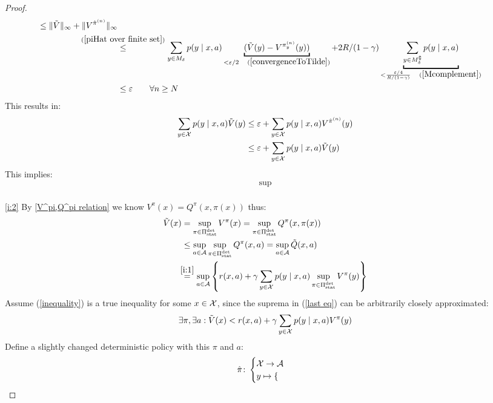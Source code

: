 \begin{proof}
\begin{align*}
{			\le \|\tilde{V}\|_\infty + \| V^{\hat{\pi}^{(n)}}\|_\infty
		} \\
		&\lxlq{(\ref{piHat over finite set})} \sum_{y\in M_\delta}p(y\mid x,a) 
		\underbracket{(\tilde{V}(y) - V^{\pi_y^{(n)}}(y))}_{
			<\varepsilon/2\quad(\ref{convergenceToTilde})
		}
		+ 2R/(1-\gamma) \underbracket{\sum_{y\in M_\delta^\complement}p(y\mid x,a)}_{
			< \frac{\varepsilon /4}{R/(1-\gamma)}\quad(\ref{Mcomplement})
		}\\
		&\le \varepsilon \qquad \forall n\ge N
	\end{align*}
	This results in:
	\begin{align*}
		\sum_{y\in\mathcal{X}}p(y\mid x,a)\tilde{V}(y) 
		&\le \varepsilon + \sum_{y\in\mathcal{X}}p(y\mid x,a) V^{\hat{\pi}^{(n)}}(y) \\
		&\le \varepsilon + \sum_{y\in\mathcal{X}}p(y\mid x,a) \tilde{V}(y)
	\end{align*}
	This implies:
	\begin{align*}
		\sup
	\end{align*}
	\\
	\ref{i:2}
	By \ref{V^pi,Q^pi relation} we know \(V^\pi(x)=Q^\pi(x,\pi(x))\) thus:
	\begin{align}
		\tilde{V}(x)& =\sup_{\pi \in \detPolicy} V^\pi(x)
		=\sup_{\pi \in \detPolicy}Q^\pi(x,\pi(x)) 
		\nonumber\\
		&\le\sup_{a\in \cA} \sup_{\pi\in\detPolicy} Q^\pi(x,a)
		=\sup_{a\in \cA} \tilde{Q}(x,a)
		\label{inequality}
		\\
		&\lxeq{\ref{i:1}} \sup_{a\in \cA}\left\{ r(x,a)+\gamma\sum\limits_{y\in\cX}p(y\mid x,a) 
		\sup_{\pi\in\detPolicy} V^\pi(y) \right\} \label{last eq}
	\end{align}
	Assume (\ref{inequality}) is a true inequality for some \(x\in\mathcal{X}\), since the suprema in (\ref{last eq}) can be arbitrarily closely approximated:
	\[ \exists \pi, \exists a : \tilde{V}(x) < r(x,a) + \gamma\sum_{y\in\mathcal{X}} p(y\mid x,a) V^\pi(y)\]
	Define a slightly changed deterministic policy with this \(\pi\) and \(a\):
	\begin{align*}
		\hat{\pi}\colon
		\begin{cases}
			\mathcal{X}\to\mathcal{A}\\
			y\mapsto
			\begin{cases}

\end{cases}
\end{cases}
\end{align*}
\end{proof}
